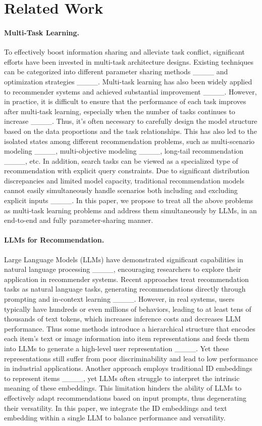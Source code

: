 \section{Related Work}
\paragraph{Multi-Task Learning.}
To effectively boost information sharing and alleviate task conflict, significant efforts have been invested in multi-task architecture designs. Existing techniques can be categorized into different parameter sharing methods ____ and optimization strategies ____.
Multi-task learning has also
been widely applied to recommender systems and achieved substantial improvement ____.
However, in practice, it is difficult to ensure that the performance of each task improves after multi-task learning, especially when the number of tasks continues to increase ____. 
Thus, it's often necessary to carefully design the model structure based on the data proportions and the task relationships.
This has also led to the isolated states among different recommendation problems, such as multi-scenario modeling ____, multi-objective modeling ____, long-tail recommendation ____, etc. 
In addition, search tasks can be viewed as a specialized type of recommendation with explicit query constraints. 
Due to significant distribution discrepancies and limited model capacity, traditional recommendation models cannot easily simultaneously handle scenarios both including and excluding explicit inputs ____.
In this paper, we propose to treat all the above problems as multi-task learning problems and address them simultaneously by LLMs, in an end-to-end and fully parameter-sharing manner.

\vspace{-10pt}
\paragraph{LLMs for Recommendation.}
Large Language Models (LLMs)  have demonstrated significant capabilities in natural language processing ____, encouraging researchers to explore their application in recommender systems.
Recent approaches  treat  recommendation tasks as natural language tasks, generating recommendations directly through prompting and in-context learning ____. 
However, in real systems, users typically have hundreds or even millions of behaviors, leading to at least tens of thousands of text tokens, which increases inference costs and decreases LLM performance.
Thus some methods introduce a hierarchical structure that encodes each item's text or image information into item representations and feeds them into LLMs to generate a high-level user representation ____. Yet these representations still suffer from poor discriminability and lead to low performance in industrial applications. 
Another approach employs traditional ID embeddings to represent items ____, yet LLMs often struggle to interpret the intrinsic meaning of these embeddings. 
This limitation hinders the ability of LLMs to effectively adapt recommendations based on input prompts, thus degenerating their versatility. 
In this paper,  we integrate the ID embeddings and text embedding 
within a single LLM to balance performance and versatility.